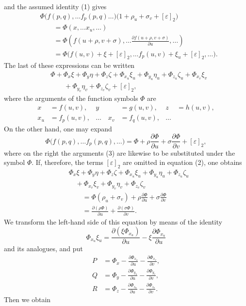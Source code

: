 \documentclass[11pt,a4paper,leqno]{article}
\begin{document}
and the assumed identity (1) gives
\begin{equation}\tag{2}
\begin{aligned}
&\Phi\bigl(f(p,q),\ldots f_p(p,q)\ldots\bigr)
\bigl(1+\rho_u+\sigma_v+[\varepsilon]_2\bigr)\\
&\qquad=\Phi(x,\ldots x_u,\ldots)\\
&\qquad=\Phi\left(
f(u+\rho,v+\sigma),\ldots
\frac{\partial f(u+\rho,v+\sigma)}{\partial u},\ldots
\right)\\
&\qquad=\Phi\bigl(
f(u,v)+\xi+[\varepsilon]_2,\ldots
f_p(u,v)+\xi_u+[\varepsilon]_2,\ldots
\bigr).
\end{aligned}
\end{equation}
The last of these expressions can be written
\[
\begin{aligned}
&\Phi+\Phi_x\xi+\Phi_y\eta+\Phi_z\zeta
+\Phi_{x_u}\xi_u+\Phi_{y_u}\eta_u+\Phi_{z_u}\zeta_u
+\Phi_{x_v}\xi_v\\
&\qquad+\Phi_{y_v}\eta_v+\Phi_{z_v}\zeta_v+[\varepsilon]_2,
\end{aligned}
\]
where the arguments of the function symbols $\Phi$ are
\begin{equation}\tag{3}
\begin{aligned}
x&=f(u,v),&y&=g(u,v),&z&=h(u,v),\\
x_u&=f_p(u,v),&\ldots\quad x_v&=f_q(u,v),&\ldots
\end{aligned}
\end{equation}
On the other hand, one may expand
\[
\Phi\bigl(f(p,q),\ldots f_p(p,q),\ldots\bigr)
=\Phi+\rho\frac{\partial\Phi}{\partial u}
+\sigma\frac{\partial\Phi}{\partial v}+[\varepsilon]_2,
\]
where on the right the arguments (3) are likewise to be substituted under the symbol $\Phi$. If, therefore, the terms $[\varepsilon]_2$ are omitted in equation (2), one obtains
\[
\begin{aligned}
&\Phi_x\xi+\Phi_y\eta+\Phi_z\zeta
+\Phi_{x_u}\xi_u+\Phi_{y_u}\eta_u+\Phi_{z_u}\zeta_u\\
&\quad+\Phi_{x_v}\xi_v+\Phi_{y_v}\eta_v+\Phi_{z_v}\zeta_v\\
&\qquad=\Phi(\rho_u+\sigma_v)
+\rho\frac{\partial\Phi}{\partial u}
+\sigma\frac{\partial\Phi}{\partial v}\\
&\qquad=\frac{\partial(\rho\Phi)}{\partial u}
+\frac{\partial(\sigma\Phi)}{\partial v}.
\end{aligned}
\]
We transform the left-hand side of this equation by means of the identity
\[
\Phi_{x_u}\xi_u
=\frac{\partial(\xi\Phi_{x_u})}{\partial u}
-\xi\frac{\partial\Phi_{x_u}}{\partial u}
\]
and its analogues, and put
\[
\begin{aligned}
P&=\Phi_x-\frac{\partial\Phi_{x_u}}{\partial u}
-\frac{\partial\Phi_{x_v}}{\partial v},\\
Q&=\Phi_y-\frac{\partial\Phi_{y_u}}{\partial u}
-\frac{\partial\Phi_{y_v}}{\partial v},\\
R&=\Phi_z-\frac{\partial\Phi_{z_u}}{\partial u}
-\frac{\partial\Phi_{z_v}}{\partial v}.
\end{aligned}
\]
Then we obtain
\end{document}

